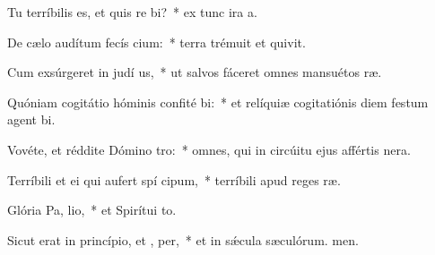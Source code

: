 \item Tu terríbilis es, et quis re bi?~* ex tunc ira a.
\item De cælo audítum fecís cium:~* terra trémuit et quivit.
\item Cum exsúrgeret in judí us,~* ut salvos fáceret omnes mansuétos ræ.
\item Quóniam cogitátio hóminis confité bi:~* et relíquiæ cogitatiónis diem festum agent bi.
\item Vovéte, et réddite Dómino  tro:~* omnes, qui in circúitu ejus affértis nera.
\item Terríbili et ei qui aufert spí cipum,~* terríbili apud reges ræ.
\item Glória Pa,  lio,~* et Spirítui to.
\item Sicut erat in princípio, et ,  per,~* et in sǽcula sæculórum. men.

